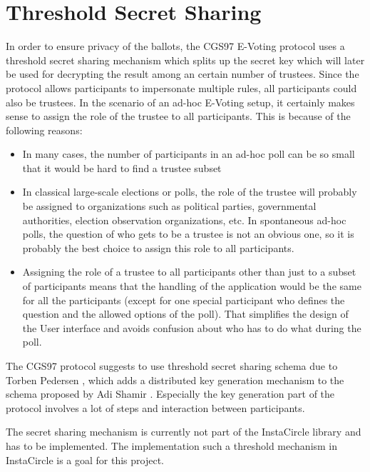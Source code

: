 \documentclass[numbers=noenddot, abstract=on]{scrreprt}
\begin{document}
\section{Threshold Secret Sharing}
\label{sec:thresholdsecretsharing}
In order to ensure privacy of the ballots, the CGS97 \cite{CGS97} E-Voting
protocol uses a threshold secret sharing mechanism which splits up the secret
key which will later be used for decrypting the result among an certain number
of trustees. Since the protocol allows participants to impersonate multiple
rules, all participants could also be trustees. In the scenario of an ad-hoc
E-Voting setup, it certainly makes sense to assign the role of the trustee to
all participants. This is because of the following reasons:
\begin{itemize}
  \item In many cases, the number of participants in an ad-hoc poll can be so
  small that it would be hard to find a trustee subset
  \item In classical large-scale elections or polls, the role of the trustee
  will probably be assigned to organizations such as political parties,
  governmental authorities, election observation organizations, etc. In
  spontaneous ad-hoc polls, the question of who gets to be a trustee is not an
  obvious one, so it is probably the best choice to assign this role to all
  participants.
  \item Assigning the role of a trustee to all participants other than just to a
  subset of participants means that the handling of the application would be the
  same for all the participants (except for one special participant who defines
  the question and the allowed options of the poll). That simplifies the design
  of the User interface and avoids confusion about who has to do what during the
  poll.
\end{itemize}

The CGS97 protocol suggests to use threshold secret sharing schema due to Torben
Pedersen \cite{PED91}, which adds a distributed key generation mechanism to the
schema proposed by Adi Shamir \cite{SHA79}. Especially the key generation part
of the protocol involves a lot of steps and interaction between participants.

The secret sharing mechanism is currently not part of the InstaCircle library
and has to be implemented. The implementation such a threshold mechanism in
InstaCircle is a goal for this project.
\end{document}
